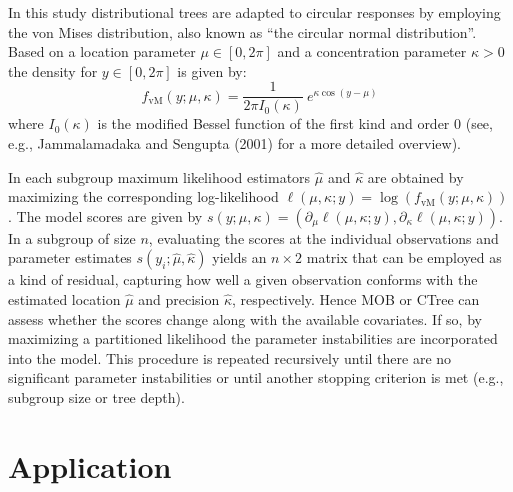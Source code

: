 \documentclass[twoside]{report}
\begin{document}
In this study distributional trees are adapted to circular responses by employing the von Mises
distribution, also known as ``the circular normal distribution''. Based on a location parameter
$\mu \in [0, 2\pi]$ and a concentration parameter $\kappa > 0$ the density for $y \in [0, 2\pi]$
is given by:
\begin{equation}
  f_\mathrm{vM}(y; \mu, \kappa) = \frac{1}{2 \pi I_0(\kappa)}~e^{ \kappa \cos(y - \mu)}\label{schlosser:equ_vm}
\end{equation}
where $I_0(\kappa)$ is the modified Bessel function of the first kind and order $0$
(see, e.g., Jammalamadaka and Sengupta (2001) for a more detailed overview).

In each subgroup maximum likelihood estimators $\hat \mu$ and $\hat \kappa$ are obtained
by maximizing the corresponding log-likelihood $\ell(\mu, \kappa; y) = \log(f_\mathrm{vM}(y;\mu, \kappa))$. 
The model scores are given by  $s(y; \mu, \kappa) = (\partial_{\mu} \ell(\mu, \kappa; y),
\partial_{\kappa} \ell(\mu, \kappa; y))$. In a subgroup of size $n$, evaluating the scores
at the individual observations and parameter estimates $s(y_i; \hat{\mu}, \hat{\kappa})$
yields an $n \times 2$ matrix that can be employed as a kind of residual, capturing how well
a given observation conforms with the estimated location $\hat{\mu}$ and precision $\hat{\kappa}$, 
respectively.
Hence MOB or CTree can assess whether the scores change along with the available covariates.
If so, by maximizing a partitioned likelihood
the parameter instabilities are incorporated into the model. This procedure is repeated recursively
until there are no significant parameter instabilities or until another stopping criterion
is met (e.g., subgroup size or tree depth).


\section{Application}
\end{document}
